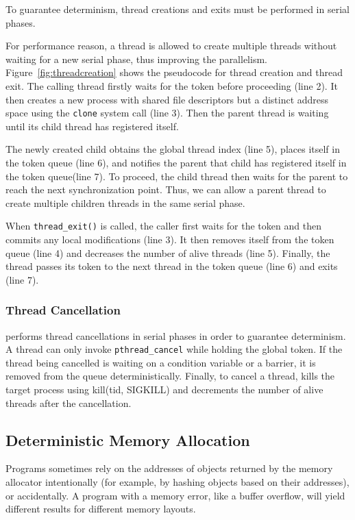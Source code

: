 To guarantee determinism, thread creations and exits must be performed in serial phases. 

For performance reason, a thread is allowed to create multiple threads without waiting for a new serial phase, thus improving the parallelism. Figure~\ref{fig:threadcreation} shows the pseudocode for thread creation and thread exit. The calling thread firstly waits for the token before proceeding (line 2). It then creates a new process with shared file descriptors but a distinct address space using the \texttt{clone} system call (line 3).  Then the parent thread is waiting until its child thread has registered itself. 

The newly created child obtains the global thread index (line 5), places itself in the token queue (line 6), and notifies the parent that child has registered itself in the token queue(line 7). To proceed, the child thread then waits for the parent to reach the next synchronization point.  Thus, we can allow a parent thread to create multiple children threads in the same serial phase. 

When \texttt{thread\_exit()} is called, the caller first waits for the token and then commits any local modifications (line 3). It then removes itself from the token queue (line 4) and decreases the number of alive threads (line 5). Finally, the thread passes its token to the next thread in the token queue (line 6) and exits (line 7).

\subsubsection{Thread Cancellation}

\dthreads{} performs thread cancellations in serial phases in order to guarantee determinism. A thread can only invoke \texttt{pthread\_cancel} while holding the global token. If the thread being cancelled is waiting on a condition variable or a barrier, it is removed from the queue deterministically. Finally, to cancel a thread, \dthreads{} kills the target process using kill(tid, SIGKILL) and decrements the number of alive threads after the cancellation.

\subsection{Deterministic Memory Allocation}
Programs sometimes rely on the addresses of objects returned by the memory allocator intentionally (for example, by hashing objects based on their addresses), or accidentally. A program with a memory error, like a buffer overflow, will yield different results for different memory layouts.

